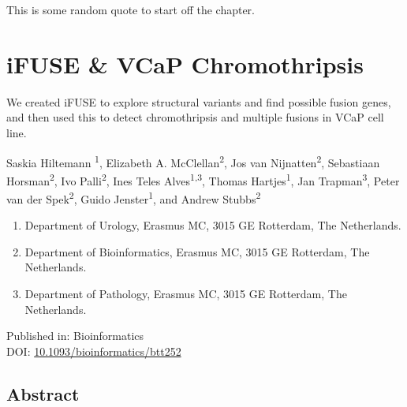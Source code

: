 \begin{savequote}[75mm]
This is some random quote to start off the chapter.
\end{savequote}

\chapter{iFUSE \& VCaP Chromothripsis}
\setcounter{figure}{-1}
\setcounter{table}{-1}
\setcounter{section}{-1}
\setcounter{NAT@ctr}{-1}

We created iFUSE to explore structural variants and find possible fusion genes, and then used this to detect chromothripsis and multiple fusions in VCaP cell line.

%
\newpage
{}
Saskia Hiltemann \textsuperscript{1}, Elizabeth A. McClellan\textsuperscript{2}, Jos van Nijnatten\textsuperscript{2}, Sebastiaan Horsman\textsuperscript{2}, Ivo Palli\textsuperscript{2}, Ines Teles Alves\textsuperscript{1,3}, Thomas Hartjes\textsuperscript{1}, Jan Trapman\textsuperscript{3}, Peter van der Spek\textsuperscript{2}, Guido Jenster\textsuperscript{1}, and Andrew Stubbs\textsuperscript{2}

\small
\begin{enumerate}
\itemsep-0.5em
\item Department of Urology, Erasmus MC, 3015 GE Rotterdam, The Netherlands.
\item Department of Bioinformatics, Erasmus MC, 3015 GE Rotterdam, The Netherlands.
\item Department of Pathology, Erasmus MC, 3015 GE Rotterdam, The Netherlands.
\end{enumerate}

Published in: Bioinformatics \\
DOI: \url{10.1093/bioinformatics/btt252} \\

\section*{Abstract}

